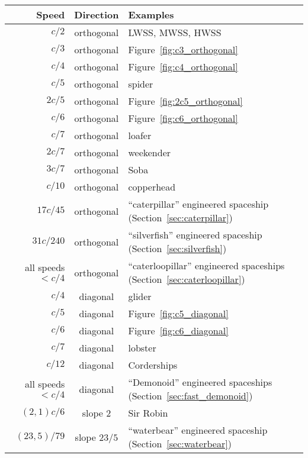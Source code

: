 \begin{table}[!htb]
	\begin{center}		
		\begin{tabular}{r c l}
			\toprule
			Speed & Direction & Examples \\ \midrule
			$c/2$ & orthogonal & LWSS, MWSS, HWSS \\
			\rowcolor{gray!20} $c/3$ & orthogonal & Figure~\ref{fig:c3_orthogonal} \\
			$c/4$ & orthogonal & Figure~\ref{fig:c4_orthogonal} \\
			\rowcolor{gray!20} $c/5$ & orthogonal & spider \\
			$2c/5$ & orthogonal & Figure~\ref{fig:2c5_orthogonal} \\
			\rowcolor{gray!20}$c/6$ & orthogonal & Figure~\ref{fig:c6_orthogonal} \\
			$c/7$ & orthogonal & loafer \\
			\rowcolor{gray!20} $2c/7$ & orthogonal & weekender \\
			$3c/7$ & orthogonal & Soba\index{Soba} \\
			\rowcolor{gray!20} $c/10$ & orthogonal & copperhead \\
			$17c/45$ & orthogonal & ``caterpillar''\index{caterpillar} engineered spaceship (Section~\ref{sec:caterpillar}) \\
			\rowcolor{gray!20} $31c/240$ & orthogonal & ``silverfish''\index{silverfish} engineered spaceship (Section~\ref{sec:silverfish}) \\
			all speeds $< c/4$ & orthogonal & ``caterloopillar''\index{caterloopillar} engineered spaceships (Section~\ref{sec:caterloopillar}) \\
			\rowcolor{gray!20} $c/4$ & diagonal & glider \\
			$c/5$ & diagonal & Figure~\ref{fig:c5_diagonal} \\
			\rowcolor{gray!20} $c/6$ & diagonal & Figure~\ref{fig:c6_diagonal} \\
			$c/7$ & diagonal & lobster \\
			\rowcolor{gray!20} $c/12$ & diagonal & Corderships\index{Cordership} \\
			all speeds $< c/4$ & diagonal & ``Demonoid'' engineered spaceships\index{Demonoid} (Section~\ref{sec:fast_demonoid}) \\
			\rowcolor{gray!20} $(2,1)c/6$ & slope $2$ & Sir Robin \\
			$(23,5)/79$ & slope $23/5$ & ``waterbear''\index{waterbear} engineered spaceship (Section~\ref{sec:waterbear}) \\

\end{tabular}
\end{center}
\end{table}
